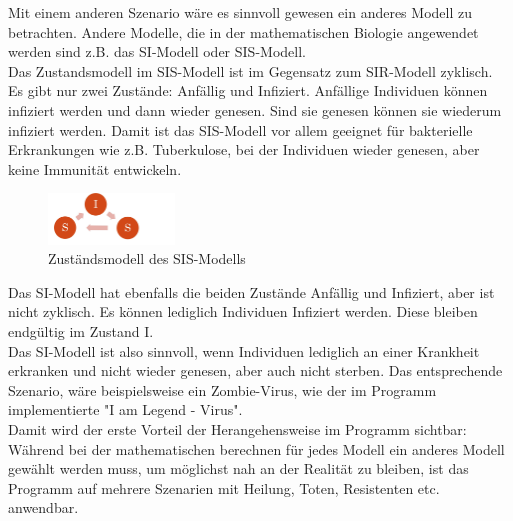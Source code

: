 Mit einem anderen Szenario wäre es sinnvoll gewesen ein anderes Modell zu betrachten. 
Andere Modelle, die in der mathematischen Biologie angewendet werden sind z.B. das SI-Modell oder SIS-Modell.\\
Das Zustandsmodell im SIS-Modell ist im Gegensatz zum SIR-Modell zyklisch. Es gibt nur zwei Zustände: Anfällig und Infiziert. Anfällige Individuen können infiziert werden und dann wieder genesen. Sind sie genesen können sie wiederum infiziert werden. Damit ist das SIS-Modell vor allem geeignet für bakterielle Erkrankungen wie z.B. Tuberkulose, bei der Individuen wieder genesen, aber keine Immunität entwickeln. \\
\begin{figure}
\includegraphics[width= 0.3\textwidth]{./images/SIS-Modell.jpg}\caption{Zuständsmodell des SIS-Modells}
\end{figure}
Das SI-Modell hat ebenfalls die beiden Zustände Anfällig und Infiziert, aber ist nicht zyklisch. Es können lediglich Individuen Infiziert werden. Diese bleiben endgültig im Zustand I.\\ 
Das SI-Modell ist also sinnvoll, wenn Individuen lediglich an einer Krankheit erkranken und nicht wieder genesen, aber auch nicht sterben. Das entsprechende Szenario, wäre beispielsweise ein Zombie-Virus, wie der im Programm implementierte "I am Legend - Virus".\\
Damit wird der erste Vorteil der Herangehensweise im Programm sichtbar: Während bei der mathematischen berechnen für jedes Modell ein anderes Modell gewählt werden muss, um möglichst nah an der Realität zu bleiben, ist das Programm auf mehrere Szenarien mit Heilung, Toten, Resistenten etc. anwendbar.